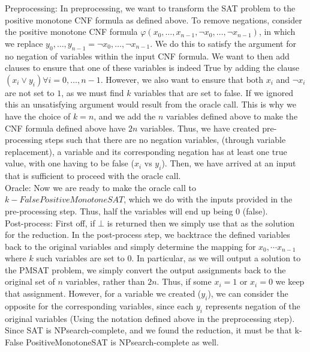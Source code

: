 \documentclass[11pt]{article}
\begin{document}
\begin{enumerate}
\begin{enumerate}
        Preprocessing: In preprocessing, we want to transform the SAT problem to the positive monotone CNF formula as defined above. To remove negations, consider the positive monotone CNF formula $\varphi(x_0, \dots, x_{n-1}, \neg x_0, \dots, \neg x_{n-1})$, in which we replace $y_0, \dots, y_{n-1} = \neg x_0, \dots, \neg x_{n-1}$. We do this to satisfy the argument for no negation of variables within the input CNF formula. We want to then add clauses to ensure that one of these variables is indeed True by adding the clause $(x_i \vee y_i)  \forall i=0, \dots, n-1$. However, we also want to ensure that both $x_i$ and $\neg x_i$ are not set to $1$, as we must find $k$ variables that are set to false. If we ignored this an unsatisfying argument would result from the oracle call. This is why we have the choice of $k=n$, and we add the $n$ variables defined above to make the CNF formula defined above have $2n$ variables. Thus, we have created pre-processing steps such that there are no negation variables, (through variable replacement), a variable and its corresponding negation has at least one true value, with one having to be false ($x_i$ vs $y_i$). Then, we have arrived at an input that is sufficient to proceed with the oracle call. \\
        
        Oracle: Now we are ready to make the oracle call to $k-False PositiveMonotoneSAT$, which we do with the inputs provided in the pre-processing step. Thus, half the variables will end up being 0 (false). \\
        
        Post-process: First off, if $\bot$ is returned then we simply use that as the solution for the reduction. In the post-process step, we backtrace the defined variables back to the original variables and simply determine the mapping for $x_0, \cdots x_{n-1}$ where $k$ such variables are set to $0$. In particular, as we will output a solution to the PMSAT problem, we simply convert the output assignments back to the original set of $n$ variables, rather than $2n$. Thus, if some $x_i = 1$ or $x_i = 0$ we keep that assignment. However, for a variable we created ($y_i$), we can consider the opposite for the corresponding variables, since each $y_i$ represents negation of the original variables (Using the notation defined above in the preprocessing step). Since SAT is NPsearch-complete, and we found the reduction, it must be that k-False PositiveMonotoneSAT is NPsearch-complete as well. \\
        

\end{enumerate}
\end{enumerate}
\end{document}
